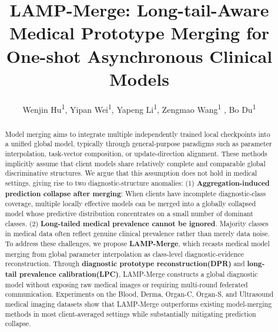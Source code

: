 \documentclass[letterpaper]{article} %
\title{LAMP-Merge: Long-tail-Aware Medical Prototype Merging for One-shot Asynchronous Clinical Models}
\author {
    Wenjin Hu\equalcontrib\textsuperscript{\rm 1},
    Yipan Wei\equalcontrib\textsuperscript{\rm 1},
    Yapeng Li\textsuperscript{\rm 1},
    Zengmao Wang\textsuperscript{\rm 1} ,
    Bo Du\textsuperscript{\rm 1}
}
\begin{document}
\maketitle

\begin{abstract}
Model merging aims to integrate multiple independently trained local checkpoints into a unified global model, typically through general-purpose paradigms such as parameter interpolation, task-vector composition, or update-direction alignment. These methods implicitly assume that client models share relatively complete and comparable global discriminative structures. We argue that this assumption does not hold in medical settings, giving rise to two diagnostic-structure anomalies: (1)\textbf{ Aggregation-induced prediction collapse after merging}: When clients have incomplete diagnostic-class coverage, multiple locally effective models can be merged into a globally collapsed model whose predictive distribution concentrates on a small number of dominant classes. (2)\textbf{ Long-tailed medical prevalence cannot be ignored}. Majority classes in medical data often reflect genuine clinical prevalence rather than merely data noise. To address these challenges, we propose \textbf{LAMP-Merge}, which recasts medical model merging from global parameter interpolation as class-level diagnostic-evidence reconstruction. Through \textbf{diagnostic prototype reconstruction(DPR)} and \textbf{long-tail prevalence calibration(LPC)}, LAMP-Merge constructs a global diagnostic model without exposing raw medical images or requiring multi-round federated communication. Experiments on the Blood, Derma, Organ-C, Organ-S, and Ultrasound medical imaging datasets show that LAMP-Merge outperforms existing model-merging methods in most client-averaged settings while substantially mitigating prediction collapse.

\end{abstract}


\end{document}

